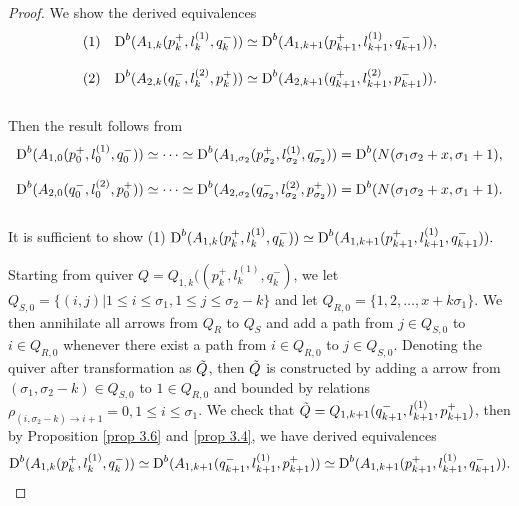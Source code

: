 \documentclass[a4paper, reqno]{amsart}
\theoremstyle{definition}
\theoremstyle{remark}
\numberwithin{equation}{section}
\begin{document}
\begin{proof}
    We show the derived equivalences 
    $$\begin{array}{ll}
 (1) & \textup{D}^{b}(A_{1,k}(p^{+}_{k},l_{k}^{(1)},q^{-}_{k}))\simeq
 \textup{D}^{b}(A_{1,k+1}(p^{+}_{k+1},l_{k+1}^{(1)},q^{-}_{k+1})),\\\\
 (2)&\textup{D}^{b}(A_{2,k}(q^{-}_{k},l_{k}^{(2)},p^{+}_{k}))\simeq
 \textup{D}^{b}(A_{2,k+1}(q^{+}_{k+1},l_{k+1}^{(2)},p^{-}_{k+1})). \end{array}$$\\
 Then the result follows from 
 $$
 \textup{D}^{b}(A_{1,0}(p^{+}_{0},l_{0}^{(1)},q^{-}_{0}))\simeq \dots 
 \simeq \textup{D}^{b}(A_{1,\sigma_2}(p^{+}_{\sigma_2},l_{\sigma_2}^{(1)},q^{-}_{\sigma_2})) = \textup{D}^{b}(N(\sigma_1\sigma_2+x,\sigma_1+1),$$

  $$
 \textup{D}^{b}(A_{2,0}(q^{-}_{0},l_{0}^{(2)},p^{+}_{0}))\simeq \dots 
 \simeq \textup{D}^{b}(A_{2,\sigma_2}(q^{-}_{\sigma_2},l_{\sigma_2}^{(2)},p^{+}_{\sigma_2})) = \textup{D}^{b}(N(\sigma_1\sigma_2+x,\sigma_1+1).$$\\

 It is sufficient to show (1) $ \textup{D}^{b}(A_{1,k}(p^{+}_{k},l_{k}^{(1)},q^{-}_{k}))\simeq
 \textup{D}^{b}(A_{1,k+1}(p^{+}_{k+1},l_{k+1}^{(1)},q^{-}_{k+1})). $
 
 Starting from quiver $ Q = Q_{1,k}((p^{+}_{k},l_{k}^{(1)},q^{-}_{k}) $, we let $ Q_{S,0} = \{(i,j)|1\leq i \leq \sigma_1, 1 \leq j \leq \sigma_2 -k\}$ and let $ Q_{R,0} = \{ 1,2,\dots,x+k\sigma_1 \}$. We then annihilate all arrows from $Q_{R}$ to $Q_{S}$ and add a path from $j\in Q_{S,0}$ to $i\in Q_{R,0}$ whenever there exist a path from $i\in Q_{R,0}$ to $j\in Q_{S,0}$. Denoting the quiver after transformation as $\Tilde{Q}$, then $\Tilde{Q}$ is constructed by adding a arrow from 
 $(\sigma_1,\sigma_2-k)\in Q_{S,0} $ to $1\in Q_{R,0}$ and bounded by relations
 $\rho_{(i,\sigma_2-k)\to i+1} =0, 1\leq i \leq \sigma_1$. We check that $\Tilde{Q} = Q_{1,k+1}(q^{-}_{k+1},l_{k+1}^{(1)},p^{+}_{k+1})$,  then by Proposition \ref{prop 3.6} and \ref{prop 3.4}, we have derived equivalences
 $$ \textup{D}^{b}(A_{1,k}(p^{+}_{k},l_{k}^{(1)},q^{-}_{k}))\simeq \textup{D}^{b}(A_{1,k+1}(q^{-}_{k+1},l_{k+1}^{(1)},p^{+}_{k+1})) \simeq
 \textup{D}^{b}(A_{1,k+1}(p^{+}_{k+1},l_{k+1}^{(1)},q^{-}_{k+1})). $$
\end{proof}
\end{document}
